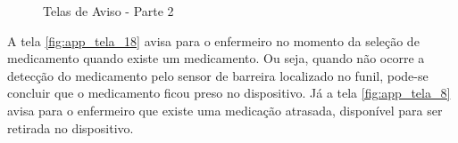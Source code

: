 \begin{apendicesenv}
\begin{figure}[H]
    \centering
    \caption{Telas de Aviso - Parte 2}\label{fig:telas_17_19_20}
\end{figure}

A tela \ref{fig:app_tela_18} avisa para o enfermeiro no momento da seleção de medicamento quando existe um medicamento. Ou seja, quando não ocorre a detecção do medicamento pelo sensor de barreira localizado no funil, pode-se concluir que o medicamento ficou preso no dispositivo. Já a tela \ref{fig:app_tela_8} avisa para o enfermeiro que existe uma medicação atrasada, disponível para ser retirada no dispositivo.


\end{apendicesenv}
